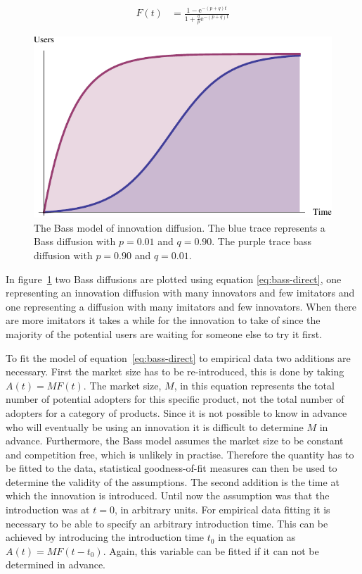 \documentclass[smallextended,final]{svjour3}
\newcommand{\e}{\mathrm{e}}
\begin{document}
\begin{align}\label{eq:bass-direct}
F(t) &= \frac{1 - \e^{-(p+q)t}}{1+\frac{q}{p}\e^{-(p+q)t}}
\end{align}

\begin{figure}
\small\centering
\includegraphics[width=\linewidth]{Bass.pdf}
\caption[Bass model of innovation diffusion]{The Bass model of innovation diffusion. The blue trace represents a Bass diffusion with $p=0.01$ and $q=0.90$. The purple trace bass diffusion with $p=0.90$ and $q=0.01$.}
\label{fig:bass}
\end{figure}

In figure~\ref{fig:bass} two Bass diffusions are plotted using equation \eqref{eq:bass-direct}, one representing an innovation diffusion with many innovators and few imitators and one representing a diffusion with many imitators and few innovators. When there are more imitators it takes a while for the innovation to take of since the majority of the potential users are waiting for someone else to try it first.

To fit the model of equation~\eqref{eq:bass-direct} to empirical data two additions are necessary. First the market size has to be re-introduced, this is done by taking $A(t) = M F(t)$. The market size, $M$, in this equation represents the total number of potential adopters for this specific product, not the total number of adopters for a category of products. Since it is not possible to know in advance who will eventually be using an innovation it is difficult to determine $M$ in advance. Furthermore, the Bass model assumes the market size to be constant and competition free, which is unlikely in practise. Therefore the quantity has to be fitted to the data, statistical goodness-of-fit measures can then be used to determine the validity of the assumptions. The second addition is the time at which the innovation is introduced. Until now the assumption was that the introduction was at $t=0$, in arbitrary units. For empirical data fitting it is necessary to be able to specify an arbitrary introduction time. This can be achieved by introducing the introduction time $t_0$ in the equation as $A(t) = M F(t - t_0)$. Again, this variable can be fitted if it can not be determined in advance.
\end{document}

